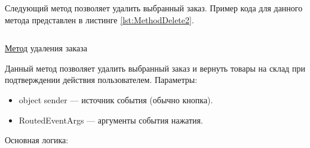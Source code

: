 \documentclass[12pt]{article}
\newcommand{\colorGIT}[1]{\textcolor{CtpLavender}{#1}}
\renewcommand{\texttt}[1]{{\small\ttfamily #1}}
\numberwithin{listing}{section}
\numberwithin{figure}{section}
\begin{document}
Следующий метод позволяет удалить выбранный заказ. Пример кода для данного метода представлен в листинге \ref{lst:MethodDelete2}.

\begin{listing}[H]
	\inputminted[firstline=268, lastline=295]{csharp}{../../3lab/StoreManager/MainWindow.xaml.cs}
	\caption{\colorGIT{\href{https://github.com/WebMasterIT/Csharp_Labs/blob/ec375afd16c0647b337cf3d8a79c8bef904fc1be/3lab/StoreManager/MainWindow.xaml.cs\#L268-L295}{Метод}} удаления заказа}
	\label{lst:MethodDelete2}
\end{listing}

Данный метод позволяет удалить выбранный заказ и вернуть товары на склад при подтверждении действия пользователем.
Параметры:
\begin{itemize}
	\item \texttt{object sender} — источник события (обычно кнопка).
	\item \texttt{RoutedEventArgs} — аргументы события нажатия.
\end{itemize}
Основная логика:
\end{document}
